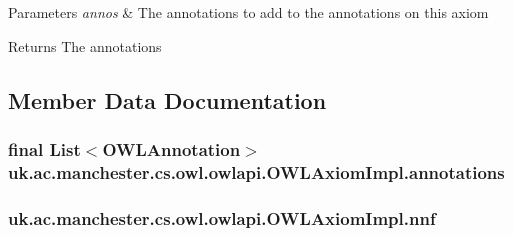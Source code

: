 \begin{DoxyParams}{Parameters}
{\em annos} & The annotations to add to the annotations on this axiom \\
\hline
\end{DoxyParams}
\begin{DoxyReturn}{Returns}
The annotations 
\end{DoxyReturn}


\subsection{Member Data Documentation}
\hypertarget{classuk_1_1ac_1_1manchester_1_1cs_1_1owl_1_1owlapi_1_1_o_w_l_axiom_impl_af6fbf6188f7bdcdc6bef5766feed695e}{
\subsubsection[{annotations}]{\setlength{\rightskip}{0pt plus 5cm}final List$<${\bf O\-W\-L\-Annotation}$>$ uk.\-ac.\-manchester.\-cs.\-owl.\-owlapi.\-O\-W\-L\-Axiom\-Impl.\-annotations\hspace{0.3cm}{\ttfamily [private]}}}\label{classuk_1_1ac_1_1manchester_1_1cs_1_1owl_1_1owlapi_1_1_o_w_l_axiom_impl_af6fbf6188f7bdcdc6bef5766feed695e}
\hypertarget{classuk_1_1ac_1_1manchester_1_1cs_1_1owl_1_1owlapi_1_1_o_w_l_axiom_impl_ac6cc3b4b7ac33a4d285b8e1db7b939c4}{
\subsubsection[{nnf}]{ uk.\-ac.\-manchester.\-cs.\-owl.\-owlapi.\-O\-W\-L\-Axiom\-Impl.\-nnf\hspace{0.3cm}{\ttfamily [private]}}}\label{classuk_1_1ac_1_1manchester_1_1cs_1_1owl_1_1owlapi_1_1_o_w_l_axiom_impl_ac6cc3b4b7ac33a4d285b8e1db7b939c4}

